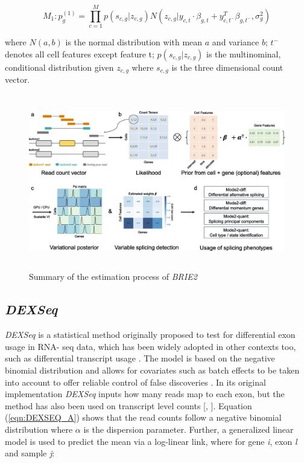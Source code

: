 \begin{equation}
M_1: p_g^{(1)} = \prod_{c=1}^{M}{p(s_{c,g} | z_{c,g}) N(z_{c,g} | y_{c,t} \cdot \beta_{g,t} + y_{c,t^-}^T \beta_{g,t^-}, \sigma_g^2)}
\label{eqn:brie_C}
\end{equation}

where $N(a,b)$ is the normal distribution with mean $a$ and variance $b$; $t^-$ denotes all cell features except feature t; $p(s_{c,g} | z_{c,g})$ is the multinominal, conditional distribution given $z_{c,g}$ where $s_{c,g}$ is the three dimensional count vector.

\begin{figure}[!htb]
\begin{center}
\includegraphics[width=6in,height=3in]{../figures/brie2_process.jpg}
\end{center}
\caption{Summary of the estimation process of \emph{BRIE2} \citep{brie2}}
\label{fig:brie2_process}
\end{figure}
\FloatBarrier

\subsection{\emph{DEXSeq}}
\emph{DEXSeq} \citep{dexseq} is a statistical method originally proposed to test for differential exon usage in RNA- seq data, which has been widely adopted in other contexts too, such as differential transcript usage \citep{swimming_downstream}. The model is based on the negative binomial distribution and allows for covariates such as batch effects to be taken into account to offer reliable control of false discoveries \citep{dexseq}. In its original implementation \emph{DEXSeq} inputs how many reads map to each exon, but the method has also been used on transcript level counts [\citep{swimming_downstream}, \citep{bandits}]. Equation (\ref{eqn:DEXSEQ_A}) shows that the read counts follow a negative binomial distribution where $\alpha$ is the dispersion parameter. Further, a generalized linear model is used to predict the mean via a log-linear link, where for gene \emph{i}, exon \emph{l} and sample \emph{j}:

